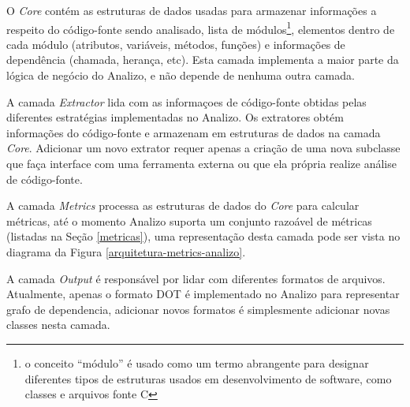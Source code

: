 O {\it Core} contém as estruturas de dados usadas para armazenar informações a
respeito do código-fonte sendo analisado, lista de módulos\footnote{o
conceito ``módulo'' é usado como um termo abrangente para designar diferentes
tipos de estruturas usados em desenvolvimento de software, como classes e
arquivos fonte C}, elementos dentro de cada módulo (atributos, variáveis,
métodos, funções) e informações de dependência (chamada, herança, etc). Esta
camada implementa a maior parte da lógica de negócio do Analizo, e não depende
de nenhuma outra camada.

A camada {\it Extractor} lida com as informaçoes de código-fonte obtidas pelas
diferentes estratégias implementadas no Analizo. Os extratores obtém
informações do código-fonte e armazenam em estruturas de dados na camada {\it
Core}. Adicionar um novo extrator requer apenas a criação de uma nova subclasse
que faça interface com uma ferramenta externa ou que ela própria realize análise
de código-fonte.


A camada {\it Metrics} processa as estruturas de dados do {\it Core} para
calcular métricas, até o momento Analizo suporta um conjunto razoável de
métricas (listadas na Seção \ref{metricas}), uma representação desta camada
pode ser vista no diagrama da Figura \ref{arquitetura-metrics-analizo}.

A camada {\it Output} é responsável por lidar com diferentes formatos de
arquivos.  Atualmente, apenas o formato DOT é implementado no Analizo para
representar grafo de dependencia, adicionar novos formatos é simplesmente
adicionar novas classes nesta camada.

